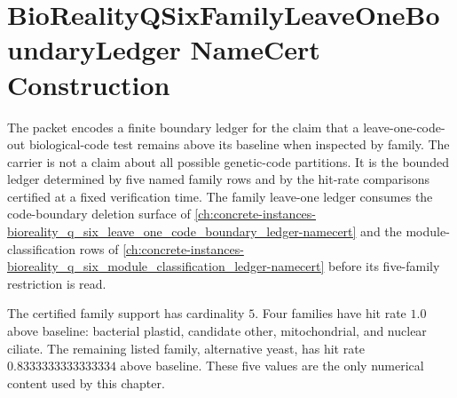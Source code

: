 \chapter{BioRealityQSixFamilyLeaveOneBoundaryLedger NameCert Construction}
\label{ch:concrete-instances-bioreality_q_six_family_leave_one_boundary_ledger-namecert}

The \BioRealityQSixFamilyLeaveOneBoundaryLedgerUp packet encodes a finite boundary ledger for the claim that a leave-one-code-out biological-code test remains above its baseline when inspected by family.  The carrier is not a claim about all possible genetic-code partitions.  It is the bounded ledger determined by five named family rows and by the hit-rate comparisons certified at a fixed verification time. The family leave-one ledger consumes the code-boundary deletion surface of \autoref{ch:concrete-instances-bioreality_q_six_leave_one_code_boundary_ledger-namecert} and the module-classification rows of \autoref{ch:concrete-instances-bioreality_q_six_module_classification_ledger-namecert} before its five-family restriction is read.

The certified family support has cardinality $5$.  Four families have hit rate $1.0$ above baseline: bacterial plastid, candidate other, mitochondrial, and nuclear ciliate.  The remaining listed family, alternative yeast, has hit rate $0.8333333333333334$ above baseline.  These five values are the only numerical content used by this chapter.



